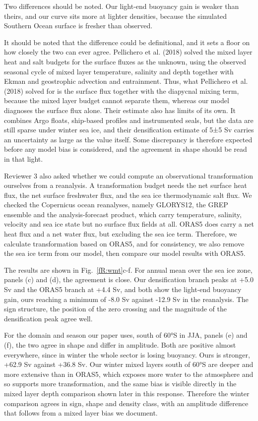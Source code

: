 \documentclass[11pt,a4paper]{article}
\begin{document}
Two differences should be noted. Our light-end buoyancy gain is weaker than theirs, and our curve sits more at lighter densities, because the simulated Southern Ocean surface is fresher than observed.

It should be noted that the difference could be definitional, and it sets a floor on how closely the two can ever agree. Pellichero et al. (2018) solved the mixed layer heat and salt budgets for the surface fluxes as the unknown, using the observed seasonal cycle of mixed layer temperature, salinity and depth together with Ekman and geostrophic advection and entrainment. Thus, what Pellichero et al. (2018) solved for is the surface flux together with the diapycnal mixing term, because the mixed layer budget cannot separate them, whereas our model diagnoses the surface flux alone. Their estimate also has limits of its own. It combines Argo floats, ship-based profiles and instrumented seals, but the data are still sparse under winter sea ice, and their densification estimate of 5±5 Sv carries an uncertainty as large as the value itself. Some discrepancy is therefore expected before any model bias is considered, and the agreement in shape should be read in that light.

Reviewer 3 also asked whether we could compute an observational transformation ourselves from a reanalysis. A transformation budget needs the net surface heat flux, the net surface freshwater flux, and the sea ice thermodynamic salt flux. We checked the Copernicus ocean reanalyses, namely GLORYS12, the GREP ensemble and the analysis-forecast product, which carry temperature, salinity, velocity and sea ice state but no surface flux fields at all. ORAS5 does carry a net heat flux and a net water flux, but excluding the sea ice term. Therefore, we calculate transformation based on ORAS5, and for consistency, we also remove the sea ice term from our model, then compare our model results with ORAS5.

The results are shown in Fig.~\ref{fR:wmt}c-f. For annual mean over the sea ice zone, panels (c) and (d), the agreement is close. Our densification branch peaks at +5.0 Sv and the ORAS5 branch at +4.4 Sv, and both show the light-end buoyancy gain, ours reaching a minimum of -8.0 Sv against -12.9 Sv in the reanalysis. The sign structure, the position of the zero crossing and the magnitude of the densification peak agree well.

For the domain and season our paper uses, south of 60°S in JJA, panels (e) and (f), the two agree in shape and differ in amplitude. Both are positive almost everywhere, since in winter the whole sector is losing buoyancy. Ours is stronger, +62.9 Sv against +36.8 Sv. Our winter mixed layers south of 60°S are deeper and more extensive than in ORAS5, which exposes more water to the atmosphere and so supports more transformation, and the same bias is visible directly in the mixed layer depth comparison shown later in this response. Therefore the winter comparison agrees in sign, shape and density class, with an amplitude difference that follows from a mixed layer bias we document.
\end{document}
